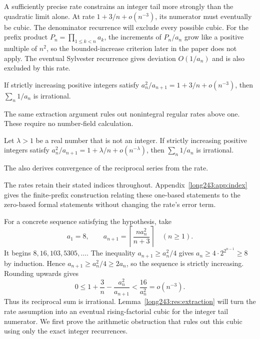 A sufficiently precise rate constrains an integer tail more strongly
than the quadratic limit alone. At rate $1+3/n+o(n^{-3})$, its
numerator must eventually be cubic. The denominator recurrence will
exclude every possible cubic. For the prefix product
$P_n=\prod_{1\le k<n}a_k$, the increments of $P_n/a_n$ grow like a
positive multiple of $n^2$, so the bounded-increase criterion
later in the paper does not apply. The eventual Sylvester recurrence gives deviation
$O(1/a_n)$ and is also excluded by this rate.

\begin{theorem}\label{long243:res:cubicrate}
If strictly increasing positive integers satisfy
$a_n^2/a_{n+1}=1+3/n+o(n^{-3})$, then $\sum_n1/a_n$ is irrational.
\end{theorem}

The same extraction argument rules out nonintegral regular rates above
one. These require no number-field calculation.

\begin{theorem}\label{long243:res:nonintegralrate}
Let $\lambda>1$ be a real number that is not an integer. If strictly
increasing positive integers satisfy
$a_n^2/a_{n+1}=1+\lambda/n+o(n^{-\lambda})$, then
$\sum_n1/a_n$ is irrational.
\end{theorem}

The 
also derives convergence of the reciprocal series from the rate.


The rates retain their stated indices throughout. Appendix~\ref{long243:app:index}
gives the finite-prefix construction relating these one-based statements
to the zero-based formal statements without changing the rate's error term.

For a concrete sequence satisfying the hypothesis, take
\[
 a_1=8,\qquad a_{n+1}=\left\lceil\frac{n a_n^2}{n+3}\right\rceil
 \quad(n\ge1).
\]
It begins $8,16,103,5305,\ldots$. The inequality $a_{n+1}\ge a_n^2/4$
gives $a_n\ge4\cdot2^{2^{n-1}}\ge8$ by induction. Hence
$a_{n+1}\ge a_n^2/4\ge2a_n$, so the sequence is strictly increasing.
Rounding upwards gives
\[
 0\le1+\frac3n-\frac{a_n^2}{a_{n+1}}<\frac{16}{a_n^2}=o(n^{-3}).
\]
Thus its reciprocal sum is irrational. Lemma~\ref{long243:res:extraction}
will turn the rate assumption into an eventual rising-factorial cubic
for the integer tail numerator. We first prove the arithmetic obstruction
that rules out this cubic using only the exact integer recurrences.


